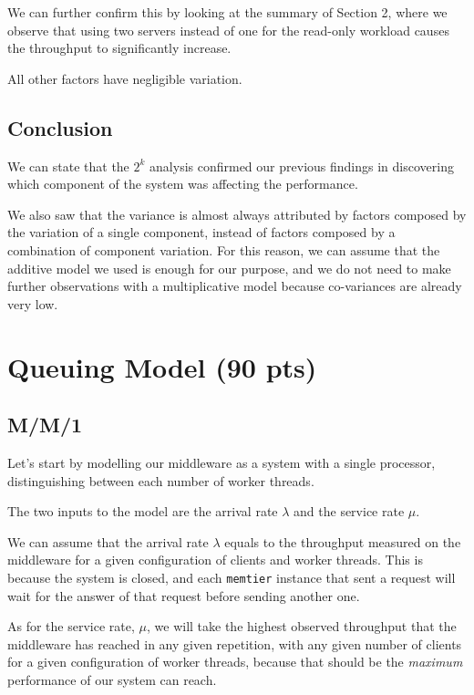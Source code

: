 \documentclass[11pt,a4paper]{article}
\renewcommand{\t}[1]{%
	{\texttt{#1}}}
\begin{document}
We can further confirm this by looking at the summary of Section 2, where we observe that using two servers instead
of one for the read-only workload causes the throughput to significantly increase.

All other factors have negligible variation.


\subsection{Conclusion}

We can state that the $2^k$ analysis confirmed our previous findings in discovering which component
of the system was affecting the performance.

We also saw that the variance is almost always attributed by factors composed by the variation of a single component, 
instead of factors composed by a combination of component variation. For this reason, we can assume that 
the additive model we used is enough for our purpose, and we do not need to make further observations with
a multiplicative model because co-variances are already very low.



\section{Queuing Model (90 pts)}
\subsection{M/M/1}

Let's start by modelling our middleware as a system with a single processor, distinguishing
between each number of worker threads.

The two inputs to the model are the arrival rate $\lambda$ and the service rate
$\mu$.

We can assume that the arrival rate $\lambda$ equals to the throughput
measured on the middleware for a given configuration of clients and worker threads.
This is because the system is closed, and each \t{memtier} instance that sent 
a request will wait for the answer of that request before sending another one.

As for the service rate, $\mu$, we will take the highest observed throughput
that the middleware has reached in any given repetition, with any given number
of clients for a given configuration of worker threads, because that should be
the \emph{maximum} performance of our system can reach.
\end{document}
